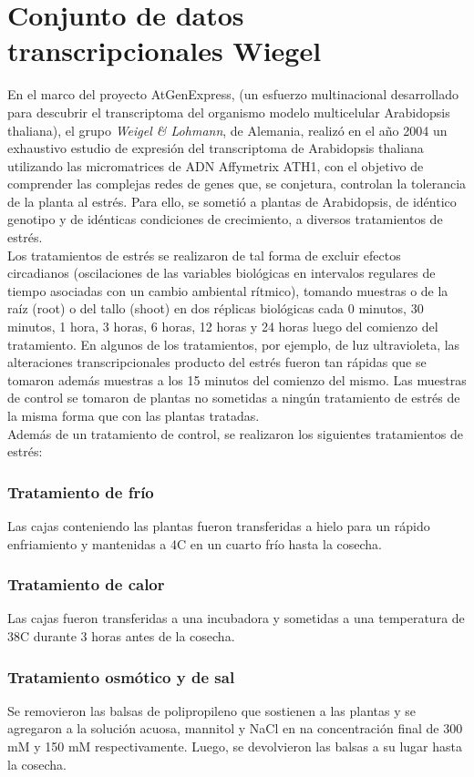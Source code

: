 \section{Conjunto de datos transcripcionales Wiegel}\label{sec:wiegel}
En el marco del proyecto AtGenExpress, (un esfuerzo multinacional desarrollado para descubrir el transcriptoma del organismo modelo multicelular Arabidopsis thaliana), el grupo \textit{Weigel \& Lohmann}, de Alemania, realizó en el año 2004 un exhaustivo estudio de expresión del transcriptoma de Arabidopsis thaliana utilizando las micromatrices de ADN Affymetrix ATH1, con el objetivo de comprender las complejas redes de genes que, se conjetura, controlan la tolerancia de la planta al estrés. Para ello, se sometió a plantas de Arabidopsis, de idéntico genotipo y de idénticas condiciones de crecimiento, a diversos tratamientos de estrés.\\
Los tratamientos de estrés se realizaron de tal forma de excluir efectos circadianos (oscilaciones de las variables biológicas en intervalos regulares de tiempo asociadas con un cambio ambiental rítmico), tomando muestras o de la raíz (root) o del tallo (shoot) en dos réplicas biológicas cada 0 minutos, 30 minutos, 1 hora, 3 horas, 6 horas, 12 horas y 24 horas luego del comienzo del tratamiento. En algunos de los tratamientos, por ejemplo, de luz ultravioleta, las alteraciones transcripcionales producto del estrés fueron tan rápidas que se tomaron además muestras a los 15 minutos del comienzo  del mismo. Las muestras de control se tomaron de plantas no sometidas a ningún tratamiento de estrés de la misma forma que con las plantas tratadas.\\
Además de un tratamiento de control, se realizaron los siguientes tratamientos de estrés:
\subsubsection*{Tratamiento de frío}
Las cajas conteniendo las plantas fueron transferidas a hielo para un rápido enfriamiento y mantenidas a 4\degree C en un cuarto frío hasta la cosecha.
\subsubsection*{Tratamiento de calor}
Las cajas fueron transferidas a una incubadora y sometidas a una temperatura de 38\degree C durante 3 horas antes de la cosecha.
\subsubsection*{Tratamiento osmótico y de sal}
Se removieron las balsas de polipropileno que sostienen a las plantas y se agregaron a la solución acuosa, mannitol y NaCl en na concentración final de 300 mM y 150 mM respectivamente. Luego, se devolvieron las balsas a su lugar hasta la cosecha.
